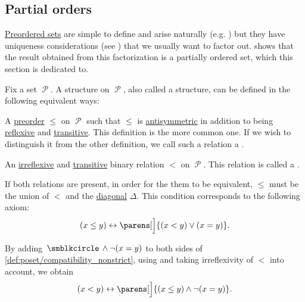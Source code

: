 \subsection{Partial orders}\label{subsec:partial_orders}

\hyperref[def:preordered_set]{Preordered sets} are simple to define and arise naturally (e.g. ) but they have uniqueness considerations (see ) that we usually want to factor out.  shows that the result obtained from this factorization is a partially ordered set, which this section is dedicated to.

\begin{definition}\label{def:poset}
  Fix a set \( \mscrP \). A  structure on \( \mscrP \), also called a  structure, can be defined in the following equivalent ways:
  \begin{thmenum}[series=def:poset]
     A \hyperref[def:preordered_set]{preorder} \( \leq \) on \( \mscrP \) such that \( \leq \) is \hyperref[def:binary_relation/antisymmetric]{antisymmetric} in addition to being \hyperref[def:binary_relation/reflexive]{reflexive} and \hyperref[def:binary_relation/transitive]{transitive}. This definition is the more common one. If we wish to distinguish it from the other definition, we call such a relation a .

     An \hyperref[def:binary_relation/irreflexive]{irreflexive} and \hyperref[def:binary_relation/transitive]{transitive} binary relation \( < \) on \( \mscrP \). This relation is called a .
  \end{thmenum}

  If both relations are present, in order for the them to be equivalent, \( \leq \) must be the union of \( < \) and the \hyperref[def:binary_relation/diagonal]{diagonal} \( \Delta \). This condition corresponds to the following axiom:
  \begin{equation}\label{def:poset/compatibility_nonstrict}
    (x \leq y) \leftrightarrow \parens[\Big]{(x < y) \vee (x = y)}.
  \end{equation}

  By adding \( \placeholder \wedge \neg (x = y) \) to both sides of \eqref{def:poset/compatibility_nonstrict}, using  and taking irreflexivity of \( < \) into account, we obtain
  \begin{equation}\label{def:poset/compatibility_strict}
    (x < y) \leftrightarrow \parens[\Big]{(x \leq y) \wedge \neg (x = y)}.
  \end{equation}


\end{definition}
